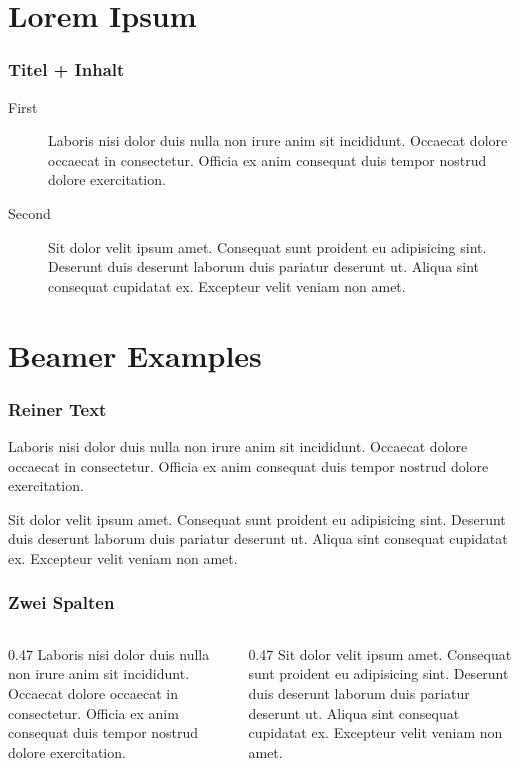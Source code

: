 \documentclass[aspectratio=169,t]{beamer}
\begin{document}
\section{Lorem Ipsum}
\begin{frame}
  \frametitle{Titel + Inhalt}

   \begin{description}
    \item[First] Laboris nisi dolor duis nulla non irure anim sit incididunt.
      Occaecat dolore occaecat in consectetur.
      Officia ex anim consequat duis tempor nostrud dolore exercitation.
    \item[Second] Sit dolor velit ipsum amet.
      Consequat sunt proident eu adipisicing sint.
      Deserunt duis deserunt laborum duis pariatur deserunt ut.
      Aliqua sint consequat cupidatat ex. Excepteur velit veniam non amet.
  \end{description}
\end{frame}

\section{Beamer Examples}
\begin{frame}
  \frametitle{Reiner Text}

  Laboris nisi dolor duis nulla non irure anim sit incididunt.
  Occaecat dolore occaecat in consectetur.
  Officia ex anim consequat duis tempor nostrud dolore exercitation.

  Sit dolor velit ipsum amet.
  Consequat sunt proident eu adipisicing sint.
  Deserunt duis deserunt laborum duis pariatur deserunt ut.
  Aliqua sint consequat cupidatat ex. Excepteur velit veniam non amet.

\end{frame}


\begin{frame}
  \frametitle{Zwei Spalten}

  \begin{columns}
    \begin{column}{0.47\textwidth}
      Laboris nisi dolor duis nulla non irure anim sit incididunt.
      Occaecat dolore occaecat in consectetur.
      Officia ex anim consequat duis tempor nostrud dolore exercitation.
    \end{column}
    \begin{column}{0.47\textwidth}
      Sit dolor velit ipsum amet.
      Consequat sunt proident eu adipisicing sint.
      Deserunt duis deserunt laborum duis pariatur deserunt ut.
      Aliqua sint consequat cupidatat ex. Excepteur velit veniam non amet.
    \end{column}
  \end{columns}
\end{frame}
\end{document}
